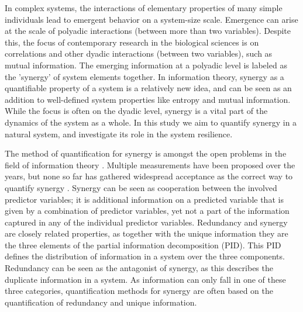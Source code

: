 \documentclass[../main.tex]{subfiles}
\begin{document}
In complex systems, the interactions of elementary properties of many simple individuals lead to emergent behavior on a system-size scale.
Emergence can arise at the scale of polyadic interactions (between more than two variables).
Despite this, the focus of contemporary research in the biological sciences is on correlations and other dyadic interactions (between two variables), such as mutual information.
The emerging information at a polyadic level is labeled as the 'synergy' of system elements together.
In information theory, synergy as a quantifiable property of a system is a relatively new idea, and can be seen as an addition to well-defined system properties like entropy and mutual information.
While the focus is often on the dyadic level, synergy is a vital part of the dynamics of the system as a whole.
In this study we aim to quantify synergy in a natural system, and investigate its role in the system resilience.

The method of quantification for synergy is amongst the open problems in the field of information theory \cite{griffith2011quantifying, olbrich2015information}.
Multiple measurements have been proposed over the years, but none so far has gathered widespread acceptance as the correct way to quantify synergy \cite{griffith2014quantifying, olbrich2015information}.
Synergy can be seen as cooperation between the involved predictor variables; it is additional information on a predicted variable that is given by a combination of predictor variables, yet not a part of the information captured in any of the individual predictor variables.
Redundancy and synergy are closely related properties, as together with the unique information they are the three elements of the partial information decomposition (PID).
This PID defines the distribution of information in a system over the three components.
Redundancy can be seen as the antagonist of synergy, as this describes the duplicate information in a system.
As information can only fall in one of these three categories, quantification methods for synergy are often based on the quantification of redundancy and unique information.
\end{document}
